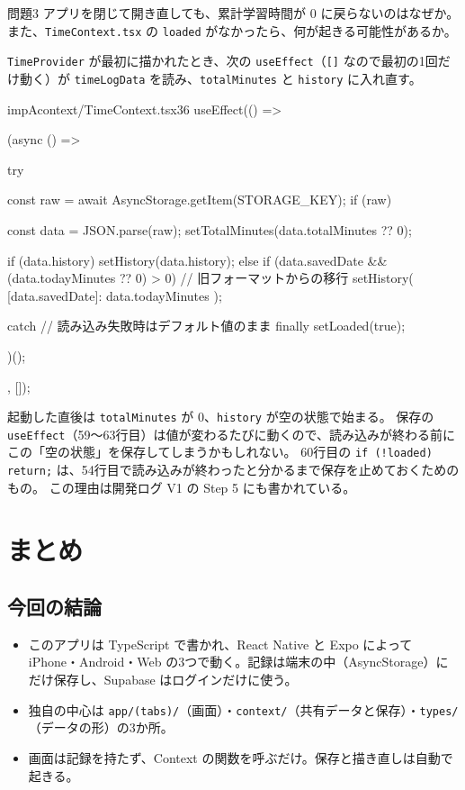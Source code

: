 \begin{kkbadgeexample}[アプリを閉じても消えない理由]{問題3}
  アプリを閉じて開き直しても、累計学習時間が 0 に戻らないのはなぜか。
  また、\texttt{TimeContext.tsx} の \texttt{loaded} がなかったら、何が起きる可能性があるか。
\end{kkbadgeexample}
\begin{kkbadgenote}[解答]
  \texttt{TimeProvider} が最初に描かれたとき、次の \texttt{useEffect}（\texttt{[]} なので最初の1回だけ動く）が
  \texttt{timeLogData} を読み、\texttt{totalMinutes} と \texttt{history} に入れ直す。

\begin{codebox}{impA}{context/TimeContext.tsx}{36}
  useEffect(() => {
    (async () => {
      try {
        const raw = await AsyncStorage.getItem(STORAGE_KEY);
        if (raw) {
          const data = JSON.parse(raw);
          setTotalMinutes(data.totalMinutes ?? 0);

          if (data.history) {
            setHistory(data.history);
          } else if (data.savedDate && (data.todayMinutes ?? 0) > 0) {
            // 旧フォーマットからの移行
            setHistory({ [data.savedDate]: data.todayMinutes });
          }
        }
      } catch {
        // 読み込み失敗時はデフォルト値のまま
      } finally {
        setLoaded(true);
      }
    })();
  }, []);
\end{codebox}

  起動した直後は \texttt{totalMinutes} が 0、\texttt{history} が空の状態で始まる。
  保存の \texttt{useEffect}（59〜63行目）は値が変わるたびに動くので、読み込みが終わる前にこの「空の状態」を保存してしまうかもしれない。
  60行目の \texttt{if (!loaded) return;} は、54行目で読み込みが終わったと分かるまで保存を止めておくためのもの。
  この理由は開発ログ V1 の Step 5 にも書かれている。\evLog
\end{kkbadgenote}

\section{まとめ}

\subsection{今回の結論}
\begin{itemize}
  \item このアプリは TypeScript で書かれ、React Native と Expo によって iPhone・Android・Web の3つで動く。記録は端末の中（AsyncStorage）にだけ保存し、Supabase はログインだけに使う。
  \item 独自の中心は \texttt{app/(tabs)/}（画面）・\texttt{context/}（共有データと保存）・\texttt{types/}（データの形）の3か所。
  \item 画面は記録を持たず、Context の関数を呼ぶだけ。保存と描き直しは自動で起きる。
\end{itemize}

